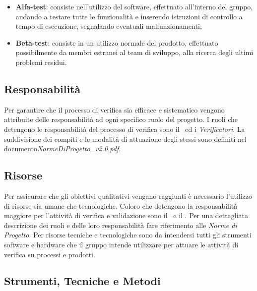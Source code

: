 \begin{itemize}
	\item \textbf{Alfa-test}: consiste nell'utilizzo del software, effettuato all'interno del gruppo, andando a testare tutte le funzionalità e inserendo istruzioni di controllo a tempo di esecuzione, segnalando eventuali malfunzionamenti;
	\item \textbf{Beta-test}: consiste in un utilizzo normale del prodotto, effettuato possibilmente da membri estranei al team di sviluppo, alla ricerca degli ultimi problemi residui.
\end{itemize}

\subsection{Responsabilità}
Per garantire che il processo di verifica sia efficace e sistematico vengono attribuite delle responsabilità ad ogni specifico ruolo del progetto. I ruoli che detengono le responsabilità del processo di verifica sono il \ruoloResponsabile\ ed i {\textit{Verificatori}}. La suddivisione dei compiti e le modalità di attuazione degli stessi sono definiti nel documento\textit{NormeDiProgetto\_v2.0.pdf}.

\subsection{Risorse}
Per assicurare che gli obiettivi qualitativi vengano raggiunti è necessario l'utilizzo di risorse sia umane che tecnologiche. Coloro che detengono la responsabilità maggiore per l'attività di verifica e validazione sono il \ruoloResponsabile\ e il \ruoloVerificatore. Per una dettagliata descrizione dei ruoli e delle loro responsabilità fare riferimento alle \textit{Norme di Progetto}. Per risorse tecniche e tecnologiche sono da intendersi tutti gli strumenti software e hardware che il gruppo intende utilizzare per attuare le attività di verifica su processi e prodotti.

\subsection{Strumenti, Tecniche e Metodi}
